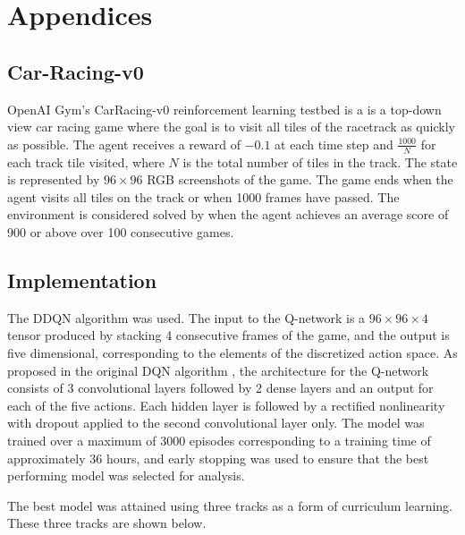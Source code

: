 \documentclass{article}
\begin{document}
\section{Appendices}
\subsection{Car-Racing-v0}

OpenAI Gym’s CarRacing-v0 reinforcement learning testbed
\cite{CarRacing} is a is a top-down view car racing game where the
goal is to visit all tiles of the racetrack as quickly as
possible. The agent receives a reward of $-0.1$ at each time step and
$\frac{1000}{N}$ for each track tile visited, where $N$ is the total
number of tiles in the track. The state is represented by $96\times96$
RGB screenshots of the game. The game ends when the agent visits all
tiles on the track or when 1000 frames have passed. The environment is
considered solved by when the agent achieves an average score of 900
or above over 100 consecutive games. 


\subsection{Implementation}
The DDQN algorithm \cite{DDQN} was used. The input
to the Q-network is a $96\times96\times4$ tensor produced by stacking
4 consecutive frames of the game, and the output is five dimensional,
corresponding to the elements of the discretized action space. As
proposed in the original DQN algorithm \cite{DQN}, the architecture
for the Q-network consists of 3 convolutional layers followed by 2
dense layers and an output for each of the five actions. Each hidden
layer is followed by a rectified nonlinearity with dropout applied to
the second convolutional layer only. The model was trained over a
maximum of 3000 episodes corresponding to a training time of
approximately 36 hours, and early stopping was used to ensure that the
best performing model was selected for analysis.  

The best model was attained using three tracks as a form of curriculum
learning. These three tracks are shown below. 
\end{document}
